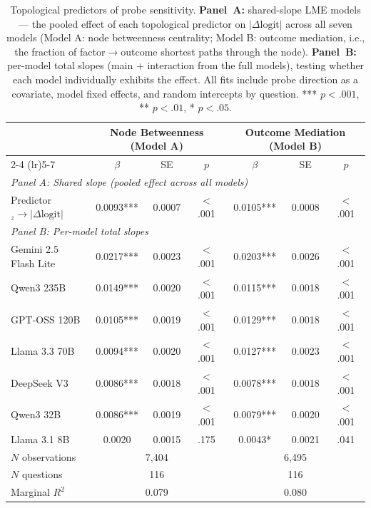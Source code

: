 \begin{table}[htbp]
\centering
\small
\caption{Topological predictors of probe sensitivity. \textbf{Panel~A:} shared-slope LME models --- the pooled effect of each topological predictor on $|\Delta\text{logit}|$ across all seven models (Model A: node betweenness centrality; Model B: outcome mediation, i.e., the fraction of factor$\rightarrow$outcome shortest paths through the node). \textbf{Panel~B:} per-model total slopes (main + interaction from the full models), testing whether each model individually exhibits the effect. All fits include probe direction as a covariate, model fixed effects, and random intercepts by question. *** $p<.001$, ** $p<.01$, * $p<.05$.}
\label{tab:lme_topology}
\begin{tabular}{lcccccc}
\toprule
 & \multicolumn{3}{c}{\textbf{Node Betweenness (Model A)}} & \multicolumn{3}{c}{\textbf{Outcome Mediation (Model B)}} \\
\cmidrule(lr){2-4} \cmidrule(lr){5-7}
 & $\beta$ & SE & $p$ & $\beta$ & SE & $p$ \\
\midrule
\multicolumn{7}{l}{\textit{Panel A: Shared slope (pooled effect across all models)}} \\
Predictor$_z \rightarrow |\Delta\text{logit}|$ & 0.0093*** & 0.0007 & $<$.001 & 0.0105*** & 0.0008 & $<$.001 \\
\midrule
\multicolumn{7}{l}{\textit{Panel B: Per-model total slopes}} \\
Gemini 2.5 Flash Lite & 0.0217*** & 0.0023 & $<$.001 & 0.0203*** & 0.0026 & $<$.001 \\
Qwen3 235B           & 0.0149*** & 0.0020 & $<$.001 & 0.0115*** & 0.0018 & $<$.001 \\
GPT-OSS 120B         & 0.0105*** & 0.0019 & $<$.001 & 0.0129*** & 0.0018 & $<$.001 \\
Llama 3.3 70B        & 0.0094*** & 0.0020 & $<$.001 & 0.0127*** & 0.0023 & $<$.001 \\
DeepSeek V3          & 0.0086*** & 0.0018 & $<$.001 & 0.0078*** & 0.0018 & $<$.001 \\
Qwen3 32B            & 0.0086*** & 0.0019 & $<$.001 & 0.0079*** & 0.0020 & $<$.001 \\
Llama 3.1 8B         & 0.0020    & 0.0015 & .175    & 0.0043*   & 0.0021 & .041    \\
\midrule
$N$ observations     & \multicolumn{3}{c}{7{,}404} & \multicolumn{3}{c}{6{,}495} \\
$N$ questions        & \multicolumn{3}{c}{116}    & \multicolumn{3}{c}{116}    \\
Marginal $R^2$       & \multicolumn{3}{c}{0.079}  & \multicolumn{3}{c}{0.080}  \\
\bottomrule
\end{tabular}
\end{table}
